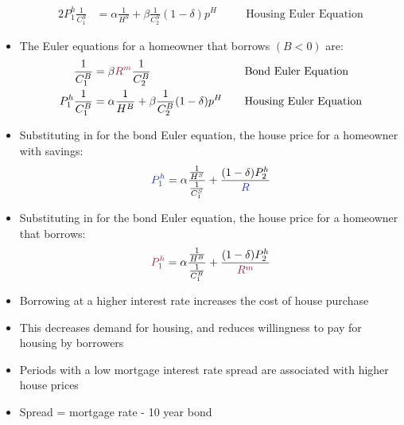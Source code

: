 \documentclass[a4paper,twoside]{article}
\numberwithin{equation}{section}
\numberwithin{figure}{section}
\begin{document}
\begin{itemize}
\begin{alignat*}{2}
			P_1^h\frac{1}{C_1^S} &= \alpha\frac{1}{H^S}+\beta\frac{1}{C_2^S}(1-\delta)p^H\quad &&\text{Housing Euler Equation}
		\end{alignat*}
		\item The Euler equations for a homeowner that \textcolor{myred}{borrows} \( (B<0) \) are:
		\begin{alignat*}{2}
			\frac{1}{C_1^B} &= \beta\textcolor{myred}{R^m}\frac{1}{C_2^B}\quad &&\text{Bond Euler Equation}\\
			P_1^h\frac{1}{C_1^B} &= \alpha\frac{1}{H^B}+\beta\frac{1}{C_2^B}(1-\delta)p^H\quad &&\text{Housing Euler Equation}
		\end{alignat*}
		\item Substituting in for the bond Euler equation, the house price for a homeowner with \textcolor{myblue}{savings}:
		\[
			\textcolor{myblue}{P_1^h} = \alpha\frac{\frac{1}{H^S}}{\frac{1}{C_1^S}}+\frac{(1-\delta)P_2^h}{\textcolor{myblue}{R}}
		\]
		\item Substituting in for the bond Euler equation, the house price for a homeowner that \textcolor{myred}{borrows}:
		\[
			\textcolor{myred}{P_1^h} = \alpha\frac{\frac{1}{H^B}}{\frac{1}{C^B_1}} + \frac{(1-\delta)P_2^h}{\textcolor{myred}{R^m}}
		\]
		\item Borrowing at a higher interest rate increases the cost of house purchase
		\item This decreases demand for housing, and reduces willingness to pay for housing by borrowers
		\item Periods with a low mortgage interest rate \textcolor{myblue}{spread} are associated with higher house prices
		\item \textcolor{myblue}{Spread} = mortgage rate - 10 year bond
	\end{itemize}
\end{document}
